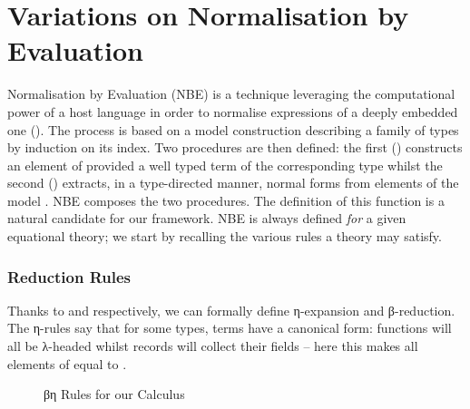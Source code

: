 \chapter{Variations on Normalisation by Evaluation}
\label{sec:variationsnormalisation}

Normalisation by Evaluation (NBE) is a technique leveraging the computational
power of a host language in order to normalise expressions of a deeply
embedded one (\cite{berger1991inverse,berger1993program,CoqDybSK,coquand2002formalised}).
The process is based on a model construction describing a family of
types by induction on its  index. Two
procedures are then defined: the first () constructs an element
of    provided a well typed term of the corresponding
   type whilst the second () extracts, in
a type-directed manner, normal forms    from elements
of the model   . NBE composes the two procedures. The
definition of this  function is a natural candidate for our
 framework. NBE is always defined \emph{for} a
given equational theory; we start by recalling the various
rules a theory may satisfy.

\subsection{Reduction Rules}

Thanks to  and  respectively, we can formally
define η-expansion and β-reduction. The η-rules say that for some types,
terms have a canonical form: functions will all be λ-headed whilst records will
collect their fields -- here this makes all elements of \AIC{\unit{}} equal to .

\begin{figure}[h]

\caption{βη Rules for our Calculus\label{fig:betaetarules}}
\end{figure}

